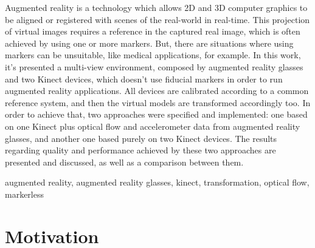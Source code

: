 \documentclass[msc, a4paper, classic, en]{ufbathesis}
\begin{document}
\abstract
Augmented reality is a technology which allows 2D and 3D computer graphics to be aligned or registered with scenes of the real-world in real-time. This projection of virtual images requires a reference in the captured real image, which is often achieved by using one or more markers. But, there are situations where using markers can be unsuitable, like medical applications, for example. In this work, it's presented a multi-view environment, composed by augmented reality glasses and two Kinect devices, which doesn't use fiducial markers in order to run augmented reality applications. All devices are calibrated according to a common reference system, and then the virtual models are transformed accordingly too. In order to achieve that, two approaches were specified and implemented: one based on one Kinect plus optical flow and accelerometer data from augmented reality glasses, and another one based purely on two Kinect devices. The results regarding quality and performance achieved by these two approaches are presented and discussed, as well as a comparison between them.
\begin{keywords}
augmented reality, augmented reality glasses, kinect, transformation, optical flow, markerless
\end{keywords}

\tableofcontents

\listoffigures

\listoftables

\mainmatter

% 
% 
% 
%

\section{Motivation}
\end{document}
